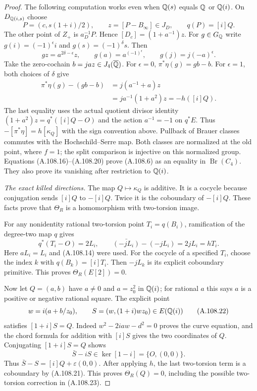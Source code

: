 \begin{proof}
The following computation works even when
$\mathbb Q(s)$ equals $\mathbb Q$ or $\mathbb Q(i)$.
On $D_{\mathbb Q(i,s)}$ choose
\[
 P=(c,s(1+i)/2),\qquad z=[P-B_\infty]\in J_D,
                    \qquad q(P)=[i]Q.
\tag{A.108.18}
\]
The other point of $Z_+$ is $a_D^{-1}P$.
Hence $[D_c]=(1+a^{-1})z$.
For $g\in G_\mathbb Q$ write
$g(i)=(-1)^\epsilon i$ and $g(s)=(-1)^\delta s$.
Then
\[
 gz=a^{2\delta-\epsilon}z,\qquad
 g(a)=a^{(-1)^\epsilon},\qquad
 g(j)=j(-a)^\epsilon.
\tag{A.108.19}
\]
Take the zero-cochain $b=jaz\in J_4(\overline{\mathbb Q})$.
For $\epsilon=0$,
$\pi^*\eta(g)=gb-b$.
For $\epsilon=1$, both choices of $\delta$ give
\[
 \begin{split}
 \pi^*\eta(g)-(gb-b)
     &=j(a^{-1}+a)z\\
     &=j a^{-1}(1+a^2)z
       =-h([i]Q).
 \end{split}
\tag{A.108.20}
\]
The last equality uses the actual quotient divisor
identity
$(1+a^2)z=q^*([i]Q-O)$ and the action $a^{-1}=-1$
on $q^*E$.
Thus $-[\pi^*\eta]=h[\kappa_Q]$ with the sign
convention above.
Pullback of Brauer classes commutes with the
Hochschild--Serre map.
Both classes are normalized at the old point,
where $f=1$; the split comparison is injective
on this normalized group.
Equations (A.108.16)--(A.108.20) prove (A.108.6)
as an equality in $\operatorname{Br}(C_4)$.
They also prove its vanishing after restriction
to $\mathbb Q(i)$.

\emph{The exact killed directions.}
The map $Q\mapsto\kappa_Q$ is additive.
It is a cocycle because conjugation sends
$[i]Q$ to $-[i]Q$.
Twice it is the coboundary of $-[i]Q$.
These facts prove that $\Theta_R$ is a
homomorphism with two-torsion image.

For any nonidentity rational two-torsion point
$T_i=q(B_i)$, ramification of the degree-two map
$q$ gives
\[
              q^*(T_i-O)=2L_i,\qquad
    \bar{(-jL_i)}-(-jL_i)=2jL_i=hT_i.
\tag{A.108.21}
\]
Here $aL_i=L_i$ and (A.108.14) were used.
For the cocycle of a specified $T_i$, choose the
index $k$ with $q(B_k)=[i]T_i$.
Then $-jL_k$ is its explicit coboundary primitive.
This proves $\Theta_R(E[2])=0$.

Now let $Q=(a,b)$ have $a\ne0$ and
$a=z_0^2$ in $\mathbb Q(i)$; for rational $a$ this says
$a$ is a positive or negative rational square.
The explicit point
\[
 w=i(a+b/z_0),\qquad
             S=(w,(1+i)wz_0)\in E(\mathbb Q(i))
\tag{A.108.22}
\]
satisfies $[1+i]S=Q$.
Indeed $w^2-2iaw-d^2=0$ proves the curve equation,
and the chord formula for addition with $[i]S$
gives the two coordinates of $Q$.
Conjugating $[1+i]S=Q$ shows
\[
             \bar S-iS\in\ker[1-i]=\{O,(0,0)\}.
\tag{A.108.23}
\]
Thus $\bar S-S=[i]Q+\varepsilon(0,0)$.
After applying $h$, the last two-torsion term is
a coboundary by (A.108.21).
This proves $\Theta_R(Q)=0$, including the possible
two-torsion correction in (A.108.23).


\end{proof}
